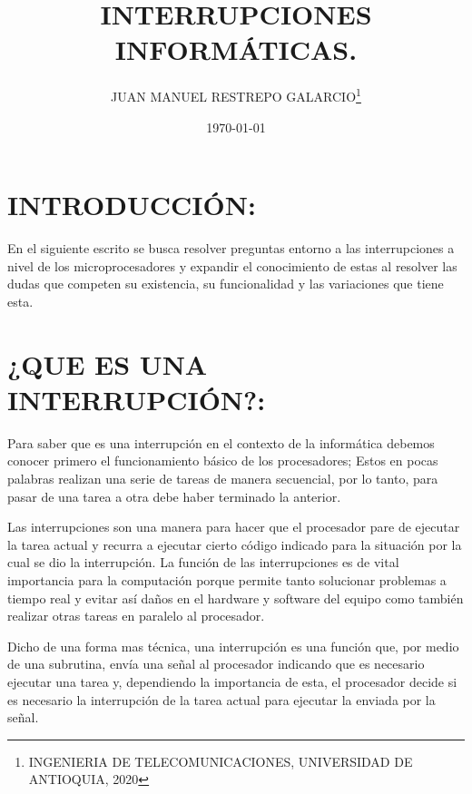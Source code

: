 \documentclass[12pt,letterpaper]{article}
\author{JUAN MANUEL RESTREPO GALARCIO\thanks{INGENIERIA DE TELECOMUNICACIONES, UNIVERSIDAD DE ANTIOQUIA, 2020}}
\title{INTERRUPCIONES INFORMÁTICAS.}
\date{\today}
\begin{document}
\maketitle





\section{INTRODUCCIÓN:}

En el siguiente escrito se busca resolver preguntas entorno a las interrupciones a nivel de los microprocesadores y expandir el conocimiento de estas al resolver las dudas que competen su existencia, su funcionalidad y las variaciones que tiene esta.


\section{¿QUE ES UNA INTERRUPCIÓN?:}

Para saber que es una interrupción en el contexto de la informática debemos conocer primero el funcionamiento básico de los procesadores; Estos en pocas palabras realizan una serie de tareas de manera secuencial, por lo tanto, para pasar de una tarea a otra debe haber terminado la anterior. 

Las interrupciones son una manera para hacer que el procesador pare de ejecutar la tarea actual y recurra a ejecutar cierto código indicado para la situación por la cual se dio la interrupción. La función de las interrupciones es de vital importancia para la computación porque permite tanto solucionar problemas a tiempo real y evitar así daños en el hardware y software del equipo como también realizar otras tareas en paralelo al procesador.

Dicho de una forma mas técnica, una interrupción es una función que, por medio de una subrutina, envía una señal al procesador indicando que es necesario ejecutar una tarea y, dependiendo la importancia de esta, el procesador decide si es necesario la interrupción de la tarea actual para ejecutar la enviada por la señal.
\end{document}
